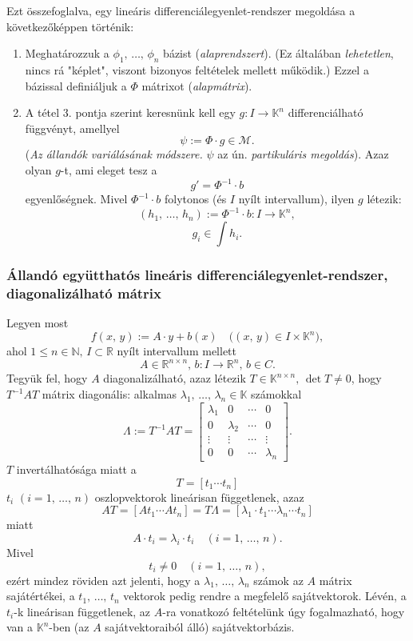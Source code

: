\documentclass{article}
\newcommand{\R}{\mathbb{R}}
\newcommand{\N}{\mathbb{N}}
\newcommand{\K}{\mathbb{K}}
\begin{document}
	Ezt összefoglalva, egy lineáris differenciálegyenlet-rendszer megoldása a következőképpen történik:
	\begin{enumerate}
		\item Meghatározzuk a $\phi_1, \, \dots, \, \phi_n$ bázist (\textit{alaprendszert}). (Ez általában \textit{lehetetlen}, nincs rá "képlet", viszont bizonyos feltételek mellett működik.) Ezzel a bázissal definiáljuk a $\Phi$ mátrixot (\textit{alapmátrix}).
		\item A tétel 3. pontja szerint keresnünk kell egy $g : I \to \K^n$ differenciálható függvényt, amellyel
		\[
			\psi := \Phi \cdot g \in \mathcal{M}.
		\]
		(\textit{Az állandók variálásának módszere.} $\psi$ az ún. \textit{partikuláris megoldás}). Azaz olyan $g$-t, ami eleget tesz a
		\[
			g' = \Phi^{-1} \cdot b
		\]
		egyenlőségnek. Mivel $\Phi^{-1} \cdot b$ folytonos (és $I$ nyílt intervallum), ilyen $g$ létezik:
		\[	
			(h_1, \, \dots, \, h_n) := \Phi^{-1} \cdot b : I \to \K^n,
		\]
		\[
			g_i \in \int h_i.
		\]	
	\end{enumerate}
	
	\subsubsection{Állandó együtthatós lineáris differenciálegyenlet-rendszer, diagonalizálható mátrix}
	Legyen most
	\[
		f(x, \, y) := A \cdot y + b(x) \quad \big( (x, \, y) \in I \times \K^n \big),
	\]
	ahol $1 \leq n \in \N, \, I \subset \R$ nyílt intervallum mellett
	\[
		A \in \R^{n \times n}, \, b : I \to \R^n, \, b \in C.
	\]
	Tegyük fel, hogy $A$ diagonalizálható, azaz létezik $T \in \K^{n \times n}, \, \det T \neq 0$, hogy $T^{-1}AT$ mátrix diagonális: alkalmas $\lambda_1, \, \dots, \, \lambda_n \in \K$ számokkal
	\[
		\Lambda := T^{-1}AT = \begin{bmatrix}
			\lambda_1 & 0 & \cdots & 0 \\
			0 & \lambda_2 & \cdots & 0 \\
			\vdots & \vdots & \cdots & \vdots \\
			0 & 0 & \cdots & \lambda_n
		\end{bmatrix}.
	\]
	$T$ invertálhatósága miatt a
	\[
		 T = [t_1 \cdots t_n]
	\]
	$t_i$ $(i=1, \, \dots, \, n)$ oszlopvektorok lineárisan függetlenek, azaz
	\[
		AT = [At_1 \cdots At_n] = T\Lambda = [\lambda_1 \cdot t_1 \cdots \lambda_n \cdots t_n]
	\]
	miatt
	\[
		A \cdot t_i = \lambda_i \cdot t_i \quad (i = 1, \, \dots, \, n).
	\]
	Mivel
	\[
		t_i \neq 0 \quad (i = 1, \, \dots, \, n),
	\]
	ezért mindez röviden azt jelenti, hogy a $\lambda_1, \, \dots, \, \lambda_n$ számok az $A$ mátrix sajátértékei, a $t_1, \, \dots, \, t_n$ vektorok pedig rendre a megfelelő sajátvektorok. Lévén, a $t_i$-k lineárisan függetlenek, az $A$-ra vonatkozó feltételünk úgy fogalmazható, hogy van a $\K^n$-ben (az $A$ sajátvektoraiból álló) sajátvektorbázis.\\
	
\end{document}

